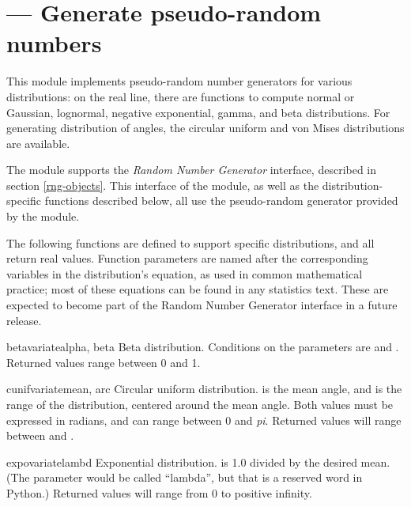 \section{ ---
         Generate pseudo-random numbers}



This module implements pseudo-random number generators for various
distributions: on the real line, there are functions to compute normal
or Gaussian, lognormal, negative exponential, gamma, and beta
distributions.  For generating distribution of angles, the circular
uniform and von Mises distributions are available.


The  module supports the \emph{Random Number
Generator} interface, described in section \ref{rng-objects}.  This
interface of the module, as well as the distribution-specific
functions described below, all use the pseudo-random generator
provided by the  module.


The following functions are defined to support specific distributions,
and all return real values.  Function parameters are named after the
corresponding variables in the distribution's equation, as used in
common mathematical practice; most of these equations can be found in
any statistics text.  These are expected to become part of the Random
Number Generator interface in a future release.

\begin{funcdesc}{betavariate}{alpha, beta}
Beta distribution.  Conditions on the parameters are
 and .
Returned values range between 0 and 1.
\end{funcdesc}

\begin{funcdesc}{cunifvariate}{mean, arc}
Circular uniform distribution.   is the mean angle, and
 is the range of the distribution, centered around the mean
angle.  Both values must be expressed in radians, and can range
between 0 and \emph{pi}.  Returned values will range between
 and .
\end{funcdesc}

\begin{funcdesc}{expovariate}{lambd}
Exponential distribution.   is 1.0 divided by the desired
mean.  (The parameter would be called ``lambda'', but that is a
reserved word in Python.)  Returned values will range from 0 to
positive infinity.
\end{funcdesc}

